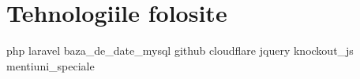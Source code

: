 \chapter{Tehnologiile folosite}
{php}
{laravel}
{baza_de_date_mysql}
{github}
{cloudflare}
{jquery}
{knockout_js}
{mentiuni_speciale}
